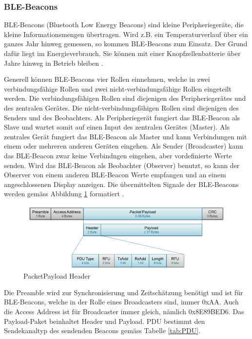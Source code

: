 \subsubsection{BLE-Beacons}
BLE-Beacons (Bluetooth Low Energy Beacons) sind kleine Peripheriegeräte, die kleine Informationsmengen übertragen. Wird z.B. ein Temperaturverlauf über ein ganzes Jahr hinweg gemessen, so kommen BLE-Beacons zum Einsatz. Der Grund dafür liegt im Energieverbrauch. Sie können mit einer Knopfzellenbatterie über Jahre hinweg in Betrieb bleiben \cite{9_Teildokument_BT}.

Generell können BLE-Beacons vier Rollen einnehmen, welche in zwei verbindungsfähige Rollen und zwei nicht-verbindungsfähige Rollen eingeteilt werden. Die verbindungsfähigen Rollen sind diejenigen des Peripheriegerätes und des zentralen Gerätes. Die nicht-verbindungsfähigen Rollen sind diejenigen des Senders und des Beobachters. Als Peripheriegerät fungiert das BLE-Beacon als Slave und wartet somit auf einen Input des zentralen Gerätes (Master). Als zentrales Gerät fungiert das BLE-Beacon als Master und kann Verbindungen mit einem oder mehreren anderen Geräten eingehen. Als Sender (Broadcaster) kann das BLE-Beacon zwar keine Verbindngen eingehen, aber vordefinierte Werte senden. Wird das BLE-Beacon als Beobachter (Observer) benutzt, so kann der Observer von einem anderen BLE-Beacon Werte empfangen und an einem angeschlossenen Display anzeigen. Die übermittelten Signale der BLE-Beacons werden gemäss Abbildung \ref{fig:PacketPayload_Header} formatiert \cite{9_Teildokument_BT}.

\begin{figure}[htbp!!!!]
	\begin{center}
		\includegraphics[width=\textwidth]{data/PacketPayload_Header.png}
		\caption[PacketPayload Header \cite{9_Teildokument_BT}]{PacketPayload Header} %
		\label{fig:PacketPayload_Header}
	\end{center}
\end{figure}

Die Preamble wird zur Synchronisierung und Zeitschätzung benötigt und ist für BLE-Beacons, welche in der Rolle eines Broadcasters sind, immer 0xAA. Auch die Access Address ist für Broadcaster immer gleich, nämlich 0x8E89BED6. Das Payload-Paket beinhaltet Header und Payload. PDU bestimmt den Sendekanaltyp des sendenden Beacons gemäss Tabelle \ref{tab:PDU}.

